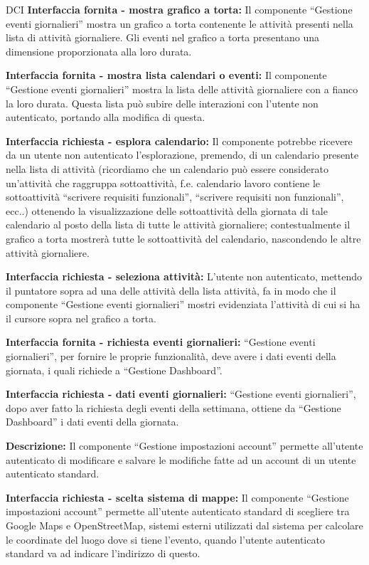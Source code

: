 \begin{listaPersonale}{DCI}
    \textbf{Interfaccia fornita - mostra grafico a torta:} Il componente “Gestione eventi giornalieri” mostra un grafico a torta contenente le attività presenti nella lista di attività giornaliere. Gli eventi nel grafico a torta presentano una dimensione proporzionata alla loro durata.

    \textbf{Interfaccia fornita - mostra lista calendari o eventi:} Il componente “Gestione eventi giornalieri” mostra la lista delle attività giornaliere con a fianco la loro durata. Questa lista può subire delle interazioni con l'utente non autenticato, portando alla modifica di questa.

    \textbf{Interfaccia richiesta - esplora calendario:} Il componente potrebbe ricevere da un utente non autenticato l'esplorazione, premendo, di un calendario presente nella lista di attività (ricordiamo che un calendario può essere considerato un'attività che raggruppa sottoattività, f.e. calendario lavoro contiene le sottoattività “scrivere requisiti funzionali”, “scrivere requisiti non funzionali”, ecc..) ottenendo la visualizzazione delle sottoattività della giornata di tale calendario al posto della lista di tutte le attività giornaliere; contestualmente il grafico a torta mostrerà tutte le sottoattività del calendario, nascondendo le altre attività giornaliere.

    \textbf{Interfaccia richiesta - seleziona attività:} L'utente non autenticato, mettendo il puntatore sopra ad una delle attività della lista attività, fa in modo che il componente “Gestione eventi giornalieri” mostri evidenziata l'attività di cui si ha il cursore sopra nel grafico a torta.

    \textbf{Interfaccia fornita - richiesta eventi giornalieri:} “Gestione eventi giornalieri”, per fornire le proprie funzionalità, deve avere i dati eventi della giornata, i quali richiede a “Gestione Dashboard”.

    \textbf{Interfaccia richiesta - dati eventi giornalieri:} “Gestione eventi giornalieri”, dopo aver fatto la richiesta degli eventi della settimana, ottiene da “Gestione Dashboard” i dati eventi della giornata.



    \textbf{Descrizione:} Il componente “Gestione impostazioni account” permette all'utente autenticato di modificare e salvare le modifiche fatte ad un account di un utente autenticato standard.

    \textbf{Interfaccia richiesta - scelta sistema di mappe:} Il componente “Gestione impostazioni account” permette all'utente autenticato standard di scegliere tra Google Maps e OpenStreetMap, sistemi esterni utilizzati dal sistema per calcolare le coordinate del luogo dove si tiene l'evento, quando l'utente autenticato standard va ad indicare l'indirizzo di questo.


\end{listaPersonale}
